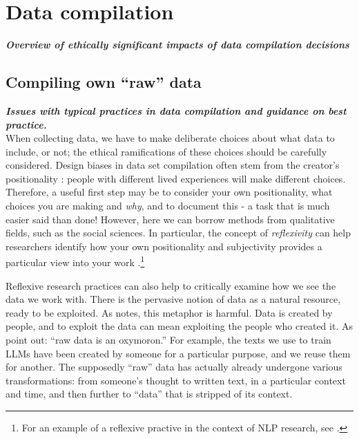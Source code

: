 \section{Data compilation}\label{sec:comp}

\noindent\textbf{\textit{Overview of ethically significant impacts of data compilation decisions}} 
\newline


\subsection{Compiling own ``raw'' data}
\noindent\textbf{\textit{Issues with typical practices in data compilation and guidance on best practice.}} 
\newline \\
When collecting data, we have to make deliberate choices about what data to include, or not; the ethical ramifications of these choices should be carefully considered. 
Design biases in data set compilation often stem from the creator's positionality \citep{talat_disembodied_2021,santy_nlpositionality_2023}: people with different lived experiences will make different choices. 
Therefore, a useful first step may be to consider your own positionality, what choices you are making and \textit{why}, and to document this - a task that is much easier said than done! However, here we can borrow methods from qualitative fields, such as the social sciences.
In particular, the concept of \textit{reflexivity} can help researchers identify how your own positionality and subjectivity provides a particular view into your work \cite{Jamieson_Reflexivity_2023}.\footnote{For an example of a reflexive practive in the context of NLP research, see \citet{Talat_It_2021}.}

Reflexive research practices can also help to critically examine how we see the data we work with. There is the pervasive notion of data as a natural resource, ready to be exploited.
As \citet{benjamin_what_2021} notes, this metaphor is harmful. 
Data is created by people, and to exploit the data can mean exploiting the people who created it. 
As \citet{rawdata2013} point out: ``raw data is an oxymoron.'' 
For example, the texts we use to train LLMs have been created by someone for a particular purpose, and we reuse them for another. 
The supposedly ``raw'' data has actually already undergone various transformations: from someone's thought to written text, in a particular context and time, and then further to ``data'' that is stripped of its context.

